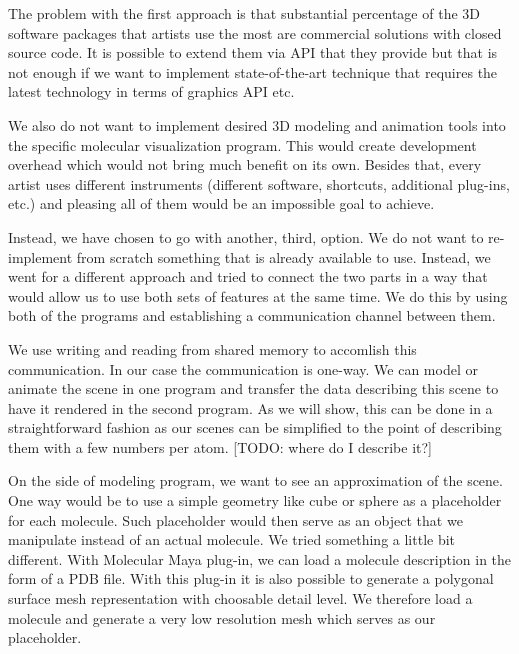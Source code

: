 \documentclass[
  digital, %
  table,   %
  nolof,     %
  nolot,     %
  oneside,
]{fithesis3}
\begin{document}
The problem with the first approach is that substantial percentage of the 3D software packages that artists use the most are commercial solutions with closed source code. It is possible to extend them via API that they provide but that is not enough if we want to implement state-of-the-art technique that requires the latest technology in terms of graphics API etc.

We also do not want to implement desired 3D modeling and animation tools into the specific molecular visualization program. This would create development overhead which would not bring much benefit on its own. Besides that, every artist uses different instruments (different software, shortcuts, additional plug-ins, etc.) and pleasing all of them would be an impossible goal to achieve.

Instead, we have chosen to go with another, third, option. We do not want to re-implement from scratch something that is already available to use. Instead, we went for a different approach and tried to connect the two parts in a way that would allow us to use both sets of features at the same time. We do this by using both of the programs and establishing a communication channel between them.

We use writing and reading from shared memory to accomlish this communication. In our case the communication is one-way. We can model or animate the scene in one program and transfer the data describing this scene to have it rendered in the second program. As we will show, this can be done in a straightforward fashion as our scenes can be simplified to the point of describing them with a few numbers per atom. [TODO: where do I describe it?]

On the side of modeling program, we want to see an approximation of the scene. One way would be to use a simple geometry like cube or sphere as a placeholder for each molecule. Such placeholder would then serve as an object that we manipulate instead of an actual molecule. We tried something a little bit different. With Molecular Maya plug-in, we can load a molecule description in the form of a PDB file. With this plug-in it is also possible to generate a polygonal surface mesh representation with choosable detail level. We therefore load a molecule and generate a very low resolution mesh which serves as our placeholder.
\end{document}
